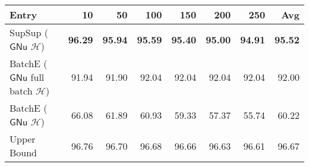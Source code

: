 \begin{tabular}{lrrrrrrr}
\toprule
                                                         Entry &    10 &    50 &   100 &   150 &   200 &   250 &   Avg \\
\midrule
            SupSup ($\ensuremath{\mathsf{GNu}}$ $\mathcal{H}$) & \textbf{96.29} & \textbf{95.94} & \textbf{95.59} & \textbf{95.40} & \textbf{95.00} & \textbf{94.91} & \textbf{95.52} \\
 BatchE ($\ensuremath{\mathsf{GNu}}$ full batch $\mathcal{H}$) & 91.94 & 91.90 & 92.04 & 92.04 & 92.04 & 92.04 & 92.00 \\
            BatchE ($\ensuremath{\mathsf{GNu}}$ $\mathcal{H}$) & 66.08 & 61.89 & 60.93 & 59.33 & 57.37 & 55.74 & 60.22 \\\midrule
                                                   Upper Bound & 96.76 & 96.70 & 96.68 & 96.66 & 96.63 & 96.61 & 96.67 \\
\bottomrule
\end{tabular}

